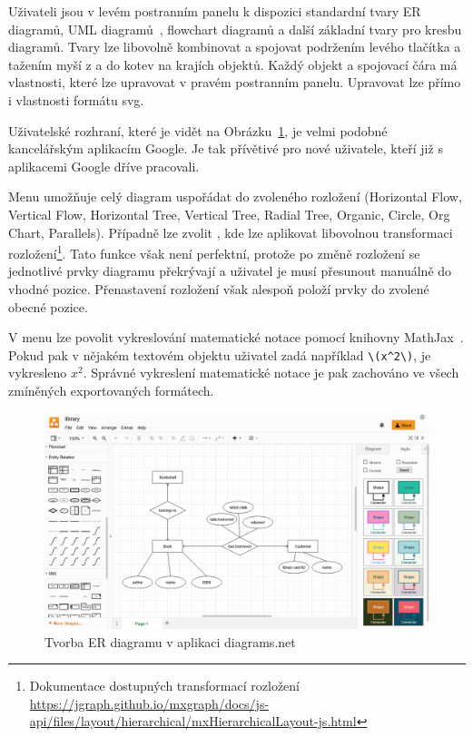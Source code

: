 Uživateli jsou v levém postranním panelu k dispozici standardní tvary ER diagramů, UML diagramů~\cite{omg_uml_2017}, flowchart diagramů a další základní tvary pro kresbu diagramů.
Tvary lze libovolně kombinovat a spojovat podržením levého tlačítka a tažením myší z a do kotev na krajích objektů.
Každý objekt a spojovací čára má vlastnosti, které lze upravovat v pravém postranním panelu.
Upravovat lze přímo i vlastnosti formátu \acrshort{svg}.

Uživatelské rozhraní, které je vidět na Obrázku~\ref{fig:diagrams.net}, je velmi podobné kancelářským aplikacím Google.
Je tak přívětivé pro nové uživatele, kteří již s aplikacemi Google dříve pracovali.

Menu  umožňuje celý diagram uspořádat do zvoleného rozložení (Horizontal Flow, Vertical Flow, Horizontal Tree, Vertical Tree, Radial Tree, Organic, Circle, Org Chart, Parallels).
Případně lze zvolit , kde lze aplikovat libovolnou transformaci rozložení\footnote{Dokumentace dostupných transformací rozložení \url{https://jgraph.github.io/mxgraph/docs/js-api/files/layout/hierarchical/mxHierarchicalLayout-js.html}}.
Tato funkce však není perfektní, protože po změně rozložení se jednotlivé prvky diagramu překrývají a uživatel je musí přesunout manuálně do vhodné pozice.
Přenastavení rozložení však alespoň položí prvky do zvolené obecné pozice.

V menu  lze povolit vykreslování matematické notace pomocí knihovny MathJax~\cite{mathjaxconsortium_mathjax_2022}.
Pokud pak v nějakém textovém objektu uživatel zadá například \verb|\(x^2\)|, je vykresleno $x^2$.
Správné vykreslení matematické notace je pak zachováno ve všech zmíněných exportovaných formátech.

\begin{figure}[!htb]
  \centering
  \includegraphics[width = \maxwidth{\textwidth}]{../img/diagrams.net.png}
  \caption{Tvorba ER diagramu v aplikaci diagrams.net}
  \label{fig:diagrams.net}
\end{figure}


